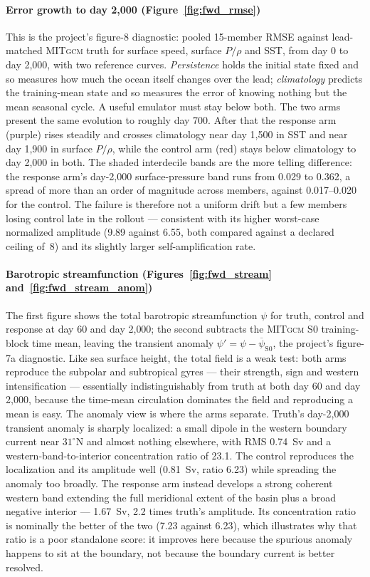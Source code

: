 \documentclass[3p,12pt]{elsarticle}
\newcommand{\MITgcm}{\textsc{MITgcm}}
\begin{document}
\paragraph{Error growth to day 2{,}000 (Figure~\ref{fig:fwd_rmse})} This is the
project's figure-8 diagnostic: pooled 15-member RMSE against lead-matched
\MITgcm{} truth for surface speed, surface $P/\rho$ and SST, from day 0 to day
2{,}000, with two reference curves. \emph{Persistence} holds the initial state
fixed and so measures how much the ocean itself changes over the lead;
\emph{climatology} predicts the training-mean state and so measures the error of
knowing nothing but the mean seasonal cycle. A useful emulator must stay below
both. The two arms present the same evolution to roughly day 700. After that the
response arm (purple) rises steadily and crosses climatology near day 1{,}500 in
SST and near day 1{,}900 in surface $P/\rho$, while the control arm (red) stays
below climatology to day 2{,}000 in both. The shaded interdecile bands are the
more telling difference: the response arm's day-2{,}000 surface-pressure band
runs from 0.029 to 0.362, a spread of more than an order of magnitude across
members, against 0.017--0.020 for the control. The failure is therefore not a
uniform drift but a few members losing control late in the rollout --- consistent
with its higher worst-case normalized amplitude (9.89 against 6.55, both compared
against a declared ceiling of~8) and its slightly larger self-amplification rate.

\paragraph{Barotropic streamfunction (Figures~\ref{fig:fwd_stream} and~\ref{fig:fwd_stream_anom})}
The first figure shows the total barotropic streamfunction $\psi$ for truth,
control and response at day 60 and day 2{,}000; the second subtracts the
\MITgcm{} S0 training-block time mean, leaving the transient anomaly
$\psi'=\psi-\overline\psi_{\mathrm{S0}}$, the project's figure-7a diagnostic.
Like sea surface height, the total field is a weak test: both arms reproduce
the subpolar and subtropical gyres --- their strength, sign and western
intensification --- essentially indistinguishably from truth at both day 60 and
day 2{,}000, because the time-mean circulation dominates the field and
reproducing a mean is easy. The anomaly view is where the arms separate.
Truth's day-2{,}000 transient anomaly is sharply localized: a small dipole in
the western boundary current near $31^\circ$N and almost nothing elsewhere,
with RMS 0.74~Sv and a western-band-to-interior concentration ratio of 23.1.
The control reproduces the localization and its amplitude well (0.81~Sv, ratio
6.23) while spreading the anomaly too broadly. The response arm instead
develops a strong coherent western band extending the full meridional extent of
the basin plus a broad negative interior --- 1.67~Sv, 2.2 times truth's
amplitude. Its concentration ratio is nominally the better of the two (7.23
against 6.23), which illustrates why that ratio is a poor standalone score: it
improves here because the spurious anomaly happens to sit at the boundary, not
because the boundary current is better resolved.
\end{document}
